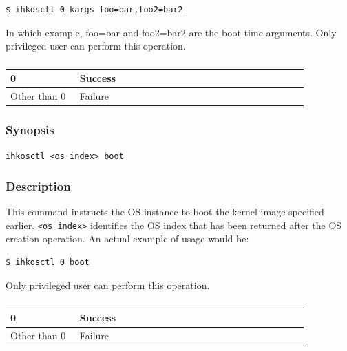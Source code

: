 \documentclass[twoside,11pt,fleqn]{book}
\begin{document}
\begin{verbatim}
$ ihkosctl 0 kargs foo=bar,foo2=bar2
\end{verbatim}

In which example, foo=bar and foo2=bar2 are the boot time arguments.
Only privileged user can perform this operation.

\subsubsection*{}
\begin{table}[!h]
\footnotesize
\begin{tabular}{|p{0.20\linewidth}|p{0.66\linewidth}|} \hline
0&Success\\ \hline
Other than 0&Failure\\ \hline
\end{tabular}
\vspace{-0em}
\end{table}
\FloatBarrier

\subsubsection{}
\subsubsection*{Synopsis}{\quad} \texttt{ihkosctl <os index> boot}
\subsubsection*{Description}{\quad}
This command instructs the OS instance to boot the kernel image specified earlier.
\texttt{<os index>} identifies the OS index
that has been returned after the OS creation operation.
An actual example of usage would be:

\begin{verbatim}
$ ihkosctl 0 boot
\end{verbatim}

Only privileged user can perform this operation.

\subsubsection*{}
\begin{table}[!h]
\footnotesize
\begin{tabular}{|p{0.20\linewidth}|p{0.66\linewidth}|} \hline
0&Success\\ \hline
Other than 0&Failure\\ \hline
\end{tabular}
\vspace{-0em}
\end{table}
\FloatBarrier
\end{document}

